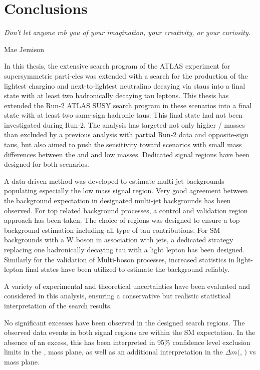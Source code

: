 \chapter*{Conclusions}
\epigraph{\emph{Don't let anyone rob you of your imagination, your creativity, or your curiosity.}} {Mae Jemison}

In this thesis,  the extensive search program of the \ac{ATLAS} experiment for supersymmetric parti-cles was extended with a search for the production of the lightest chargino and next-to-lightest neutralino decaying via staus into a final state with at least two hadronically decaying tau leptons. 
This thesis has extended the Run-2 \ac{ATLAS} \ac{SUSY} search program in these scenarios into a final state with at least two same-sign hadronic taus.  This final state had not been investigated during Run-2.
The analysis has targeted not only higher \Cone / \Ntwo masses than excluded by a previous analysis with partial Run-2 data and opposite-sign taus,  but also aimed to push the sensitivity toward scenarios with small mass differences between the \Ntwo and \None and low \Cone masses. Dedicated signal regions have been designed for both scenarios. 

A data-driven method was developed to estimate multi-jet backgrounds populating especially the low mass signal region.  Very good agreement between the background expectation in designated multi-jet backgrounds has been observed.  For top related background processes,  a control and validation region approach has been taken.  The choice of regions was designed to ensure a top background estimation including all type of tau contributions.  For \ac{SM} backgrounds  with a W boson in association with jets,  a dedicated strategy replacing one hadronically decaying tau with a light lepton has been designed.  Similarly for the validation of Multi-boson processes,  increased statistics in light-lepton final states have been utilized to estimate the background reliably.

A variety of experimental and theoretical uncertainties have been evaluated and considered in this analysis,  ensuring a conservative but realistic statistical interpretation of the search results. 

No significant excesses have been observed in the designed search regions.  The observed data events in both signal regions are within the \ac{SM} expectation.  In the absence of an excess,  this has been interpreted in 95\% confidence level exclusion limits in the \Cone, \None mass plane,  as well as an additional interpretation in the $\Delta m ($\Cone , \None$)$ vs \None mass plane.   

